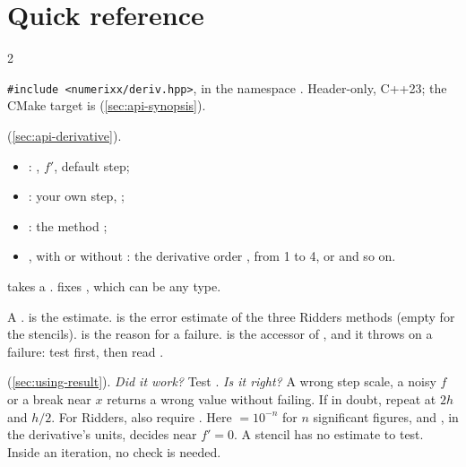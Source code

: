 \chapter*{Quick reference}\label{ch:quick-reference}
\begin{fullwidth}
\small{}\setlength{\parskip}{4pt plus 1pt}
\setlength{\columnsep}{8mm}
\begin{multicols}{2}
\raggedright

 \texttt{\#include <numerixx/deriv.hpp>}, in the namespace . Header-only, C++23;
the CMake target is  (\cref{sec:api-synopsis}).

 (\cref{sec:api-derivative}).
\begin{itemize}\setlength{\itemsep}{0pt}\setlength{\parskip}{0pt}
  \item {}: , $f'$, default step;
  \item {}: your own step, ;
  \item {}: the method ;
  \item {}, with or without : the derivative order , from 1 to 4, or
     and so on.
\end{itemize}
 takes a .  fixes , which can be any  type.

 A .  is the estimate.
 is the error estimate of the three Ridders methods (empty for the stencils).  is
the reason for a failure.  is the accessor of , and it throws on a failure: test
first, then read .

 (\cref{sec:using-result}). \emph{Did it work?} Test . \emph{Is it right?} A wrong
step scale, a noisy $f$ or a break near $x$ returns a wrong value without failing. If in doubt, repeat at $2h$ and
$h/2$. For Ridders, also require . Here
 $= 10^{-n}$ for $n$ significant figures, and , in the derivative's units, decides near
$f' = 0$. A stencil has no estimate to test. Inside an iteration, no check is needed.


\end{multicols}
\end{fullwidth}
